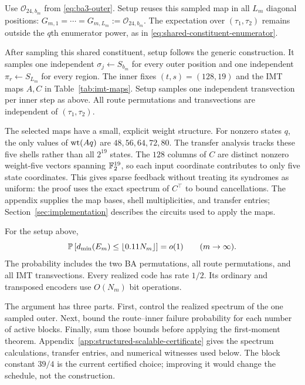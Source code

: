 Use $\mathcal O_{24,b_m}$ from \eqref{eq:ba3-outer}. Setup reuses this sampled
map in all $L_m$ diagonal positions:
$G_{m,1}=\cdots=G_{m,L_m}:=\mathcal O_{24,b_m}$.
The expectation over $(\tau_1,\tau_2)$ remains outside the
$q$th enumerator power, as in
\eqref{eq:shared-constituent-enumerator}.

After sampling this shared constituent, setup follows the generic
construction. It samples one independent $\sigma_j\gets S_{b_m}$ for every
outer position and one independent $\pi_r\gets S_{L_m}$ for every region.
The inner fixes $(t,s)=(128,19)$ and the IMT maps $A,C$ in
Table~\ref{tab:imt-maps}. Setup samples one independent transvection per
inner step as above. All route permutations and transvections are independent
of $(\tau_1,\tau_2)$.

The selected maps have a small, explicit weight structure. For nonzero
states $q$, the only values of $\operatorname{wt}(Aq)$ are $48,56,64,72,80$.
The transfer analysis tracks these five shells rather than all $2^{19}$
states. The $128$ columns of $C$ are distinct nonzero weight-five vectors
spanning $\mathbb F_2^{19}$, so each input coordinate contributes to only five
state coordinates. This gives sparse feedback without treating its
syndromes as uniform: the proof uses the exact spectrum of $C^\top$ to
bound cancellations. The appendix supplies the map bases, shell
multiplicities, and transfer entries; Section~\ref{sec:implementation}
describes the circuits used to apply the maps.

\begin{theorem}
\label{thm:structured-spin-scalable}
For the setup above,
\begin{equation}
  \mathbb P\left[
    d_{\min}(E_m)\le\lfloor0.11N_m\rfloor
  \right]
  =o(1)
  \qquad(m\to\infty).
  \label{eq:structured-spin-distance}
\end{equation}
The probability includes the two BA permutations, all route permutations,
and all IMT transvections. Every realized code has rate $1/2$. Its ordinary
and transposed encoders use $O(N_m)$ bit operations.
\end{theorem}

The argument has three parts. First, control the realized spectrum of the
one sampled outer. Next, bound the route--inner failure probability for
each number of active blocks. Finally, sum those bounds before applying
the first-moment theorem. Appendix~\ref{app:structured-scalable-certificate}
gives the spectrum calculations, transfer entries, and numerical witnesses
used below.
The block constant $39/4$ is the current certified choice; improving it
would change the schedule, not the construction.

